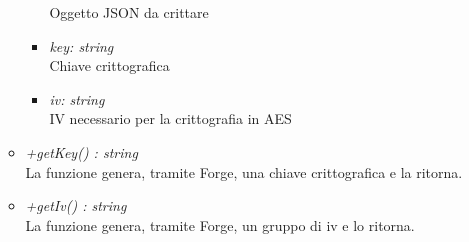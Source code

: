\begin{itemize}
\begin{itemize}
\begin{itemize}
              Oggetto JSON da crittare
              \item \emph{key: string}\\
              Chiave crittografica
              \item \emph{iv: string}\\
              IV necessario per la crittografia in AES
            \end{itemize}
             \item \emph{+getKey() : string}\\
             La funzione genera, tramite Forge, una chiave crittografica e la ritorna.
             \item \emph{+getIv() : string}\\
             La funzione genera, tramite Forge, un gruppo di iv e lo ritorna.
          \end{itemize}
        \end{itemize}
